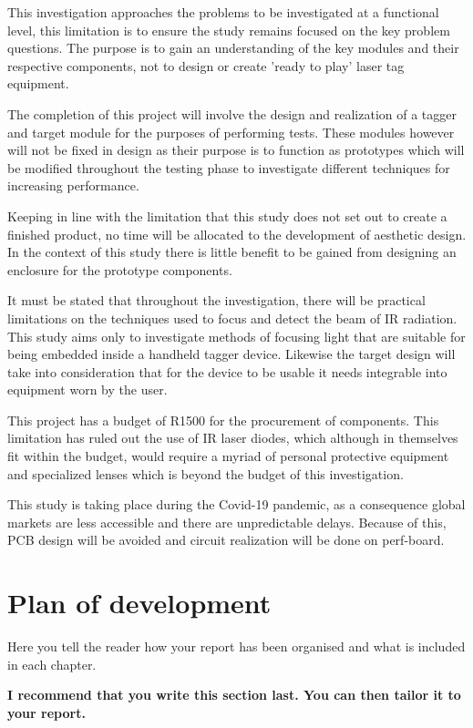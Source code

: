 This investigation approaches the problems to be investigated at a functional level, this limitation is to ensure the study remains focused on the key problem questions. The purpose is to gain an understanding of the key modules and their respective components, not to design or create 'ready to play' laser tag equipment.

The completion of this project will involve the design and realization of a tagger and target module for the purposes of performing tests. These modules however will not be fixed in design as their purpose is to function as prototypes which will be modified throughout the testing phase to investigate different techniques for increasing performance.

Keeping in line with the limitation that this study does not set out to create a finished product, no time will be allocated to the development of aesthetic design. In the context of this study there is little benefit to be gained from designing an enclosure for the prototype components.

It must be stated that throughout the investigation, there will be practical limitations on the techniques used to focus and detect the beam of IR radiation. This study aims only to investigate methods of focusing light that are suitable for being embedded inside a handheld tagger device. Likewise the target design will take into consideration that for the device to be usable it needs integrable into equipment worn by the user.

This project has a budget of R1500 for the procurement of components. This limitation has ruled out the use of IR laser diodes, which although in themselves fit within the budget, would require a myriad of personal protective equipment and specialized lenses which is beyond the budget of this investigation.

This study is taking place during the Covid-19 pandemic, as a consequence global markets are less accessible and there are unpredictable delays. Because of this, PCB design will be avoided and circuit realization will be done on perf-board.





\section{Plan of development}
Here you tell the reader how your report has been organised and what is included in each
chapter.

{\bf I recommend that you write this section last. You can then tailor it to your report.}
